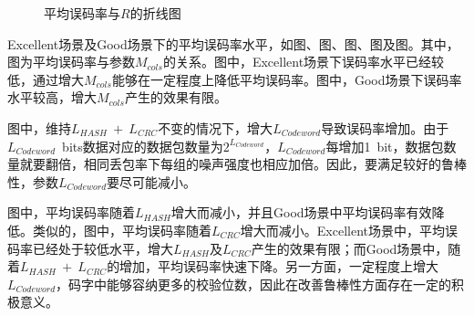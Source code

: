 {    \begin{figure}[htb]
        \centering
        \caption{平均误码率与$R$的折线图}
        \label{fig:5:result:ber:r}
    \end{figure}
}

Excellent场景及Good场景下的平均误码率水平，如图、图、图、图及图。其中，图为平均误码率与参数$M_{cols}$的关系。图中，Excellent场景下误码率水平已经较低，通过增大$M_{cols}$能够在一定程度上降低平均误码率。图中，Good场景下误码率水平较高，增大$M_{cols}$产生的效果有限。

图中，维持$L_{HASH}\ +\ L_{CRC}$不变的情况下，增大$L_{Codeword}$导致误码率增加。由于{$L_{Codeword}$\ bits}数据对应的数据包数量为$2^{L_{Codeword}}$，$L_{Codeword}$每增加{1\ bit}，数据包数量就要翻倍，相同丢包率下每组的噪声强度也相应加倍。因此，要满足较好的鲁棒性，参数$L_{Codeword}$要尽可能减小。

图中，平均误码率随着$L_{HASH}$增大而减小，并且Good场景中平均误码率有效降低。类似的，图中，平均误码率随着$L_{CRC}$增大而减小。Excellent场景中，平均误码率已经处于较低水平，增大$L_{HASH}$及$L_{CRC}$产生的效果有限；而Good场景中，随着$L_{HASH}\ +\ L_{CRC}$的增加，平均误码率快速下降。另一方面，一定程度上增大$L_{Codeword}$，码字中能够容纳更多的校验位数，因此在改善鲁棒性方面存在一定的积极意义。

